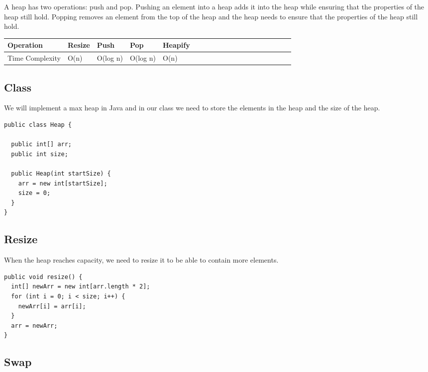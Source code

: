 \documentclass[11pt,oneside]{book}
\begin{document}
A heap has two operations: push and pop. Pushing an element into a heap adds it into the heap while ensuring that the properties of the heap still hold. Popping removes an element from the top of the heap and the heap needs to ensure that the properties of the heap still hold.

\begin{center}\begin{tabulary}{0.4\linewidth}{|l|l|l|l|l|l|l|l|l|l|l|l|l|l|l|l|l|l|l}\hline


  Operation &
  Resize &
  Push &
  Pop &
  Heapify\\
\hline


  Time Complexity &
  O(n) &
  O(log n) &
  O(log n) &
  O(n)\\

\hline\end{tabulary}\end{center}

\subsection{Class}

We will implement a max heap in Java and in our class we need to store the elements in the heap and the size of the heap.

\begin{lstlisting}
public class Heap {

  public int[] arr;
  public int size;

  public Heap(int startSize) {
    arr = new int[startSize];
    size = 0;
  }
}
\end{lstlisting}

\subsection{Resize}

When the heap reaches capacity, we need to resize it to be able to contain more elements.

\begin{lstlisting}
public void resize() {
  int[] newArr = new int[arr.length * 2];
  for (int i = 0; i < size; i++) {
    newArr[i] = arr[i];
  }
  arr = newArr;
}
\end{lstlisting}

\subsection{Swap}
\end{document}
